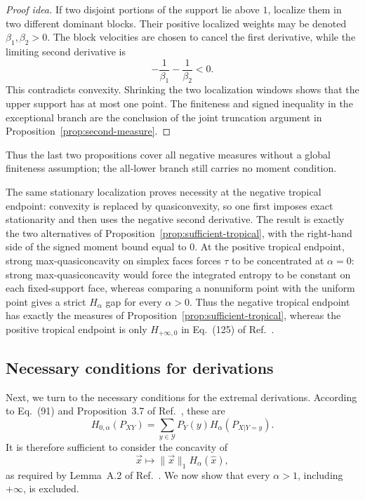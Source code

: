 \documentclass[11pt]{article}
\theoremstyle{definition}
\newcommand{\Y}{\mathcal{Y}}
\begin{document}
\begin{proof}[Proof idea]
If two disjoint portions of the support lie above $1$, localize them in two
different dominant blocks.  Their positive localized weights may be denoted
$\beta_1,\beta_2>0$.  The block velocities are chosen to cancel the first
derivative, while the limiting second derivative is
\begin{equation}
-\frac1{\beta_1}-\frac1{\beta_2}<0.
\end{equation}
This contradicts convexity.  Shrinking the two localization windows shows that
the upper support has at most one point.  The finiteness and signed inequality in
the exceptional branch are the conclusion of the joint truncation argument in
Proposition~\ref{prop:second-measure}.
\end{proof}

Thus the last two propositions cover all negative measures without a global
finiteness assumption; the all-lower branch still carries no moment condition.

The same stationary localization proves necessity at the negative tropical
endpoint: convexity is replaced by quasiconvexity, so one first imposes exact
stationarity and then uses the negative second derivative.  The result is exactly
the two alternatives of Proposition~\ref{prop:sufficient-tropical}, with the
right-hand side of the signed moment bound equal to $0$.  At the positive
tropical endpoint, strong max-quasiconcavity on simplex faces forces
$\tau$ to be concentrated at $\alpha=0$: strong max-quasiconcavity would force
the integrated entropy to be constant on each fixed-support face, whereas
comparing a nonuniform point with the uniform point gives a strict $H_\alpha$ gap
for every $\alpha>0$.
Thus the negative tropical endpoint has exactly the measures of
Proposition~\ref{prop:sufficient-tropical}, whereas the positive tropical endpoint
is only $H_{+\infty,0}$ in Eq.~(125) of Ref.~\cite{rubboli2026complete}.

\subsection{Necessary conditions for derivations}
\label{sec:necessary-derivations}

Next, we turn to the necessary conditions for the extremal derivations.  According
to Eq.~(91) and Proposition~3.7 of Ref.~\cite{rubboli2026complete}, these are
\begin{equation}
H_{0,\alpha}(P_{XY})=
\sum_{y\in\Y}P_Y(y)H_\alpha(P_{X|Y=y}).
\end{equation}
It is therefore sufficient to consider the concavity of
\begin{equation}
\vec{x}\longmapsto\|\vec{x}\|_1H_\alpha(\hat{x}),
\end{equation}
as required by Lemma~A.2 of Ref.~\cite{rubboli2026complete}.  We now show that
every $\alpha>1$, including $+\infty$, is excluded.
\end{document}
